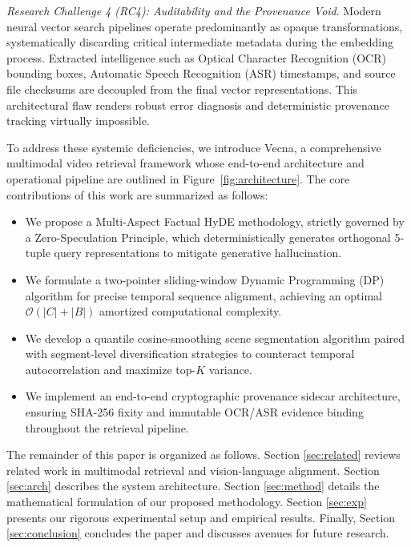 \textit{Research Challenge 4 (RC4): Auditability and the Provenance Void}. Modern neural vector search pipelines operate predominantly as opaque transformations, systematically discarding critical intermediate metadata during the embedding process. Extracted intelligence such as Optical Character Recognition (OCR) bounding boxes, Automatic Speech Recognition (ASR) timestamps, and source file checksums are decoupled from the final vector representations. This architectural flaw renders robust error diagnosis and deterministic provenance tracking virtually impossible.

To address these systemic deficiencies, we introduce Vecna, a comprehensive multimodal video retrieval framework whose end-to-end architecture and operational pipeline are outlined in Figure~\ref{fig:architecture}. The core contributions of this work are summarized as follows:
\begin{itemize}
    \item We propose a Multi-Aspect Factual HyDE methodology, strictly governed by a Zero-Speculation Principle, which deterministically generates orthogonal 5-tuple query representations to mitigate generative hallucination.
    \item We formulate a two-pointer sliding-window Dynamic Programming (DP) algorithm for precise temporal sequence alignment, achieving an optimal $\mathcal{O}(|C|+|B|)$ amortized computational complexity.
    \item We develop a quantile cosine-smoothing scene segmentation algorithm paired with segment-level diversification strategies to counteract temporal autocorrelation and maximize top-$K$ variance.
    \item We implement an end-to-end cryptographic provenance sidecar architecture, ensuring SHA-256 fixity and immutable OCR/ASR evidence binding throughout the retrieval pipeline.
\end{itemize}

The remainder of this paper is organized as follows. Section \ref{sec:related} reviews related work in multimodal retrieval and vision-language alignment. Section \ref{sec:arch} describes the system architecture. Section \ref{sec:method} details the mathematical formulation of our proposed methodology. Section \ref{sec:exp} presents our rigorous experimental setup and empirical results. Finally, Section \ref{sec:conclusion} concludes the paper and discusses avenues for future research.

